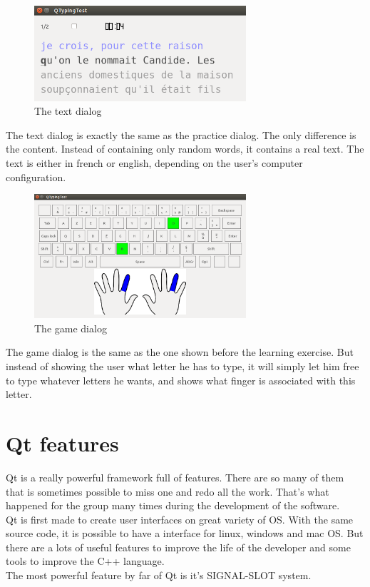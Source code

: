 \begin{figure}[H]
	\centering
	\includegraphics[width=0.7\textwidth]{images/dialog-text.png}
	 \caption{The text dialog}
	 \label{dialog-text}
\end{figure}

The text dialog is exactly the same as the practice dialog. The only difference is the content. Instead of containing only random words, it contains a real text. The text is either in french or english, depending on the user's computer configuration.

\begin{figure}[H]
	\centering
	\includegraphics[width=0.7\textwidth]{images/dialog-game.png}
	 \caption{The game dialog}
	 \label{dialog-game}
\end{figure}

The game dialog is the same as the one shown before the learning exercise. But instead of showing the user what letter he has to type, it will simply let him free to type whatever letters he wants, and shows what finger is associated with this letter. \\




\section{Qt features}

Qt is a really powerful framework full of features. There are so many of them that is sometimes possible to miss one and redo all the work. That's what happened for the group many times during the development of the software.\\
Qt is first made to create user interfaces on great variety of OS. With the same source code, it is possible to have a interface for linux, windows and mac OS. But there are a lots of useful features to improve the life of the developer and some tools to improve the C++ language.\\
The most powerful feature by far of Qt is it's SIGNAL-SLOT system.

